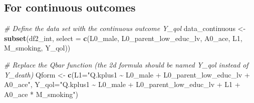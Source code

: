 \documentclass[
]{book}
\newenvironment{Shaded}{\begin{snugshade}}{\end{snugshade}}
\newcommand{\AttributeTok}[1]{\textcolor[rgb]{0.13,0.29,0.53}{#1}}
\newcommand{\CommentTok}[1]{\textcolor[rgb]{0.56,0.35,0.01}{\textit{#1}}}
\newcommand{\FunctionTok}[1]{\textcolor[rgb]{0.13,0.29,0.53}{\textbf{#1}}}
\newcommand{\NormalTok}[1]{#1}
\newcommand{\OtherTok}[1]{\textcolor[rgb]{0.56,0.35,0.01}{#1}}
\newcommand{\StringTok}[1]{\textcolor[rgb]{0.31,0.60,0.02}{#1}}
\begin{document}
\subsection{For continuous outcomes}\label{for-continuous-outcomes}

\begin{Shaded}
\begin{Highlighting}[]
\CommentTok{\# Define the data set with the continuous outcome Y\_qol}
\NormalTok{data\_continuous }\OtherTok{\textless{}{-}} \FunctionTok{subset}\NormalTok{(df2\_int, }\AttributeTok{select =} \FunctionTok{c}\NormalTok{(L0\_male, L0\_parent\_low\_educ\_lv,}
\NormalTok{                                              A0\_ace, L1,}
\NormalTok{                                              M\_smoking, Y\_qol))}

\CommentTok{\# Replace the Qbar function (the 2d formula should be named Y\_qol instead of Y\_death)}
\NormalTok{Qform }\OtherTok{\textless{}{-}} \FunctionTok{c}\NormalTok{(}\AttributeTok{L1=}\StringTok{"Q.kplus1 \textasciitilde{} L0\_male + L0\_parent\_low\_educ\_lv + A0\_ace"}\NormalTok{,}
           \AttributeTok{Y\_qol=}\StringTok{"Q.kplus1 \textasciitilde{} L0\_male + L0\_parent\_low\_educ\_lv + L1 +}
\StringTok{                    A0\_ace * M\_smoking"}\NormalTok{)}


\end{Highlighting}
\end{Shaded}
\end{document}

